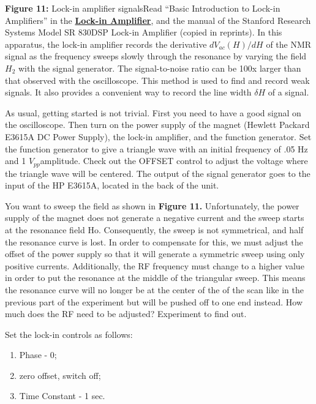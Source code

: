 \documentclass{../lab}
\begin{document}
\textbf{Figure 11:} Lock-in amplifier signalsRead ``Basic Introduction to Lock-in Amplifiers'' in the \href{http://www.advancedlab.org/mediawiki/index.php/NMR\_Lock\_In\_Amplifier}{\textbf{Lock-in Amplifier}}, and the manual of the Stanford Research Systems Model SR 830DSP Lock-in Amplifier (copied in reprints). In this apparatus, the lock-in amplifier records the derivative $dV_{ac}(H)/dH$ of the NMR signal as the frequency sweeps slowly through the resonance by varying the field $H_2$  with the signal generator. The signal-to-noise ratio can be 100x larger than that observed with the oscilloscope. This method is used to find and record weak signals. It also provides a convenient way to record the line width $\delta H$ of a signal.

As usual, getting started is not trivial. First you need to have a good signal on the oscilloscope. Then turn on the power supply of the magnet (Hewlett Packard E3615A DC Power Supply), the lock-in amplifier, and the function generator. Set the function generator to give a triangle wave with an initial frequency of .05 Hz and 1 $ V_{pp}$amplitude. Check out the OFFSET control to adjust the voltage where the triangle wave will be centered. The output of the signal generator goes to the input of the HP E3615A, located in the back of the unit.

You want to sweep the field as shown in \textbf{Figure 11.} Unfortunately, the power supply of the magnet does not generate a negative current and the sweep starts at the resonance field Ho. Consequently, the sweep is not symmetrical, and half the resonance curve is lost. In order to compensate for this, we must adjust the offset of the power supply so that it will generate a symmetric sweep using only positive currents. Additionally, the RF frequency must change to a higher value in order to put the resonance at the middle of the triangular sweep. This means the resonance curve will no longer be at the center of the of the scan like in the previous part of the experiment but will be pushed off to one end instead. How much does the RF need to be adjusted? Experiment to find out.

Set the lock-in controls as follows:

\begin{enumerate}
    \item Phase - 0;

    \item zero offset, switch off;

    \item Time Constant - 1 sec.

\end{enumerate}
\end{document}
